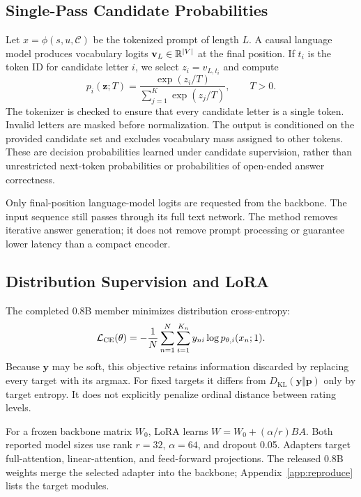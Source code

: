 \subsection{Single-Pass Candidate Probabilities}
Let $x=\phi(s,u,\mathcal{C})$ be the tokenized prompt of length $L$. A causal language model produces vocabulary logits $\mathbf{v}_{L}\in\mathbb{R}^{|V|}$ at the final position. If $t_i$ is the token ID for candidate letter $i$, we select $z_i=v_{L,t_i}$ and compute
\begin{equation}
p_i(\mathbf{z};T)=\frac{\exp(z_i/T)}{\sum_{j=1}^{K}\exp(z_j/T)},\qquad T>0.
\label{eq:softmax}
\end{equation}
The tokenizer is checked to ensure that every candidate letter is a single token. Invalid letters are masked before normalization. The output is conditioned on the provided candidate set and excludes vocabulary mass assigned to other tokens. These are decision probabilities learned under candidate supervision, rather than unrestricted next-token probabilities or probabilities of open-ended answer correctness.

Only final-position language-model logits are requested from the backbone. The input sequence still passes through its full text network. The method removes iterative answer generation; it does not remove prompt processing or guarantee lower latency than a compact encoder.

\subsection{Distribution Supervision and LoRA}
The completed 0.8B member minimizes distribution cross-entropy:
\begin{equation}
\mathcal{L}_{\mathrm{CE}}(\theta)=-\frac{1}{N}\sum_{n=1}^{N}\sum_{i=1}^{K_n}y_{ni}\log p_{\theta,i}(x_n;1).
\label{eq:ce}
\end{equation}
Because $\mathbf{y}$ may be soft, this objective retains information discarded by replacing every target with its argmax. For fixed targets it differs from $D_{\mathrm{KL}}(\mathbf{y}\Vert\mathbf{p})$ only by target entropy. It does not explicitly penalize ordinal distance between rating levels.

For a frozen backbone matrix $W_0$, LoRA learns $W=W_0+(\alpha/r)BA$. Both reported model sizes use rank $r=32$, $\alpha=64$, and dropout 0.05. Adapters target full-attention, linear-attention, and feed-forward projections. The released 0.8B weights merge the selected adapter into the backbone; Appendix~\ref{app:reproduce} lists the target modules.


